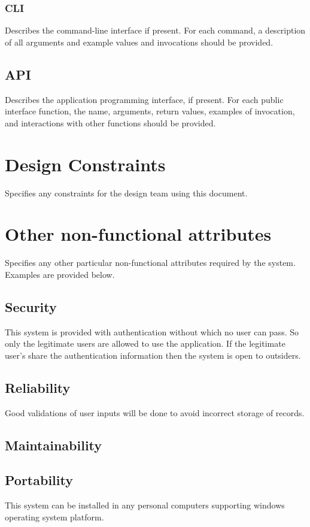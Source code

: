 \documentclass[]{article}
\begin{document}
\subsubsection { CLI}
Describes the command-line interface if present. For each command, a description of all arguments and example values and invocations should be provided. 

\subsection {API}
Describes the application programming interface, if present. For each public interface function, the name, arguments, return values, examples of invocation, and interactions with other functions should be provided. 

\section{Design Constraints}
Specifies any constraints for the design team using this document. 

\section{Other non-functional attributes}
Specifies any other particular non-functional attributes required by the system. Examples are provided below. 

\subsection {Security}
This system is provided with authentication without which no user can pass. So only the legitimate users are allowed to use the application. If the legitimate user’s share the authentication information then the system is open to outsiders.



\subsection {Reliability}
Good validations of user inputs will be done to avoid incorrect storage of records.
\subsection {Maintainability}
\subsection {Portability}
This system can be installed in any personal computers supporting windows operating system platform.
\end{document}
